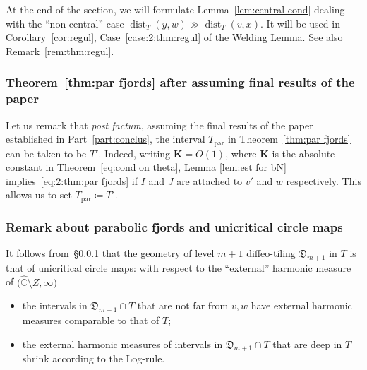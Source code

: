 \documentclass{amsart}
\newcommand{\1}{{\mathbb 1 }}
\newcommand{\bK}{{\mathbf K}}
\newcommand\parab{{\operatorname{par}}}
\newcommand{\wC}{\widehat{\mathbb{C}}}
\newcommand{\Dbb}{{\mathfrak{D}}}
\theoremstyle{remark}
\numberwithin{equation}{section}
\theoremstyle{definition}
\newcommand{\dist}{\operatorname{dist}}
\begin{document}
At the end of the section, we will formulate Lemma~\ref{lem:central cond} dealing with the ``non-central'' case  $\dist_T(y,w)\gg \dist_T(v,x)$. It will be used in Corollary~\ref{cor:regul}, Case~\ref{case:2:thm:regul} of the Welding Lemma. See also Remark~\ref{rem:thm:regul}.


\subsubsection{Theorem~\ref{thm:par fjords} after assuming final results of the paper}
\label{sss:thm:par fjords:post factum} Let us remark that \emph{post factum}, assuming the final results of the paper established in Part~\ref{part:conclus}, the interval $T_\parab$ in Theorem~\ref{thm:par fjords} can be taken to be $T'$. Indeed, writing $\bK=O(1)$, where $\bK$ is the absolute constant in Theorem~\ref{eq:cond on theta}, Lemma \ref{lem:est for bN} implies~\eqref{eq:2:thm:par fjords} if $I$ and $J$ are attached to $v'$ and $w$ respectively. This allows us to set $T_\parab\coloneqq T'$.


\subsubsection{Remark about parabolic fjords and unicritical circle maps}\label{sss:rem:crit circle maps and fjords} It follows from~\S\ref{sss:thm:par fjords:post factum} that the geometry of level $m+1$ diffeo-tiling $\Dbb_{m+1}$ in $T$ is that of unicritical circle maps: with respect to the ``external'' harmonic measure of $\big(\wC\setminus \overline Z,\infty \big)$ 
\begin{itemize}
\item the intervals in $\Dbb_{m+1}\cap T$ that are not far from $v,w$ have external harmonic measures comparable to that of $T$;
\item the external harmonic measures of intervals in $\Dbb_{m+1}\cap T$ that are deep in $T$ shrink according to the Log-rule. 
\end{itemize}
\end{document}

